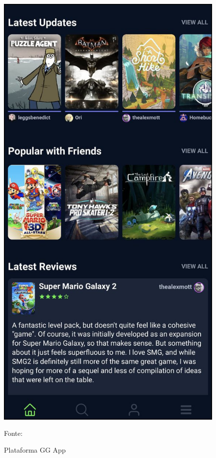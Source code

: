 \begin{figure}[H]
	\centering
	\includegraphics[scale=0.35]{./imagens/introducao/ggapp.png}
	\caption{Plataforma GG App}
	\label{ggapp}
	Fonte: \cite{ggapp}
\end{figure}

